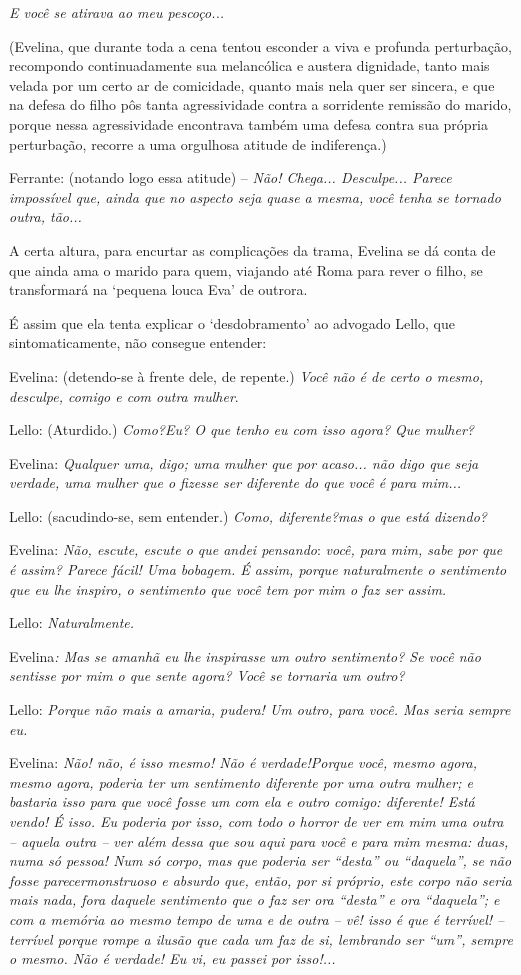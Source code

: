 \emph{E você se atirava ao meu pescoço...}

(Evelina, que durante toda a cena tentou esconder a viva e profunda
perturbação, recompondo continuadamente sua melancólica e austera
dignidade, tanto mais velada por um certo ar de comicidade, quanto mais
nela quer ser sincera, e que na defesa do filho pôs tanta agressividade
contra a sorridente remissão do marido, porque nessa agressividade
encontrava também uma defesa contra sua própria perturbação, recorre a
uma orgulhosa atitude de indiferença.)

Ferrante: (notando logo essa atitude) -- \emph{Não! Chega... Desculpe...
Parece impossível que, ainda que no aspecto seja quase a mesma, você
tenha se tornado outra, tão...}

A certa altura, para encurtar as complicações da trama, Evelina se dá
conta de que ainda ama o marido para quem, viajando até Roma para rever
o filho, se transformará na `pequena louca Eva' de outrora.

É assim que ela tenta explicar o `desdobramento' ao advogado Lello, que
sintomaticamente, não consegue entender:

Evelina: (detendo-se à frente dele, de repente.) \emph{Você não é de
certo o mesmo, desculpe, comigo e com outra mulher}.

Lello: (Aturdido.) \emph{Como?Eu? O que tenho eu com isso agora? Que
mulher?}

Evelina: \emph{Qualquer uma, digo; uma mulher que por acaso... não digo
que seja verdade, uma mulher que o fizesse ser diferente do que você é
para mim...}

Lello: (sacudindo-se, sem entender.) \emph{Como, diferente?mas o que
está dizendo?}

Evelina: \emph{Não, escute, escute o que andei pensando}: \emph{você,
para mim, sabe por que é assim? Parece fácil! Uma bobagem. É assim,
porque naturalmente o sentimento que eu lhe inspiro, o sentimento que
você tem por mim o faz ser assim. }

Lello: \emph{Naturalmente.}

Evelina\emph{: Mas se amanhã eu lhe inspirasse um outro sentimento? Se
você não sentisse por mim o que sente agora? Você se tornaria um outro?}

Lello: \emph{Porque não mais a amaria, pudera! Um outro, para você. Mas
seria sempre eu. }

Evelina: \emph{Não! não, é isso mesmo! Não é verdade!Porque você, mesmo
agora, mesmo agora, poderia ter um sentimento diferente por uma outra
mulher; e bastaria isso para que você fosse um com ela e outro comigo:
diferente! Está vendo! É isso. Eu poderia por isso, com todo o horror de
ver em mim uma outra -- aquela outra -- ver além dessa que sou aqui para
você e para mim mesma: duas, numa só pessoa! Num só corpo, mas que
poderia ser ``desta'' ou ``daquela'', se não fosse parecermonstruoso e
absurdo que, então, por si próprio, este corpo não seria mais nada, fora
daquele sentimento que o faz ser ora ``desta'' e ora ``daquela''; e com
a memória ao mesmo tempo de uma e de outra -- vê! isso é que é terrível!
-- terrível porque rompe a ilusão que cada um faz de si, lembrando ser
``um'', sempre o mesmo. Não é verdade! Eu vi, eu passei por isso!...}

